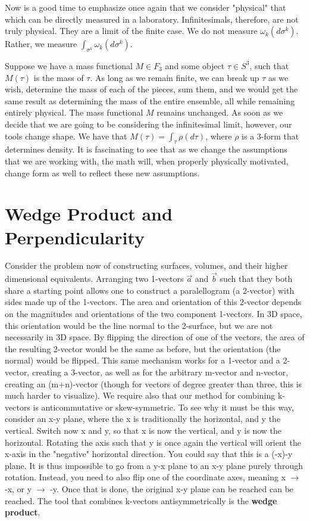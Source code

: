 \documentclass{book}
\begin{document}
Now is a good time to emphasize once again that we consider "physical" that which can be directly measured in a laboratory. Infinitesimals, therefore, are not truly physical. They are a limit of the finite case. We do not measure $\omega_k(d\sigma^k)$. Rather, we measure $\int_{\sigma^k}\omega_k(d\sigma^k)$. 


Suppose we have a mass functional $M \in F_3$ and some object $\tau \in S^3$, such that $M(\tau)$ is the mass of $\tau$.  As long as we remain finite, we can break up $\tau$ as we wish, determine the mass of each of the pieces, sum them, and we would get the same result as determining the mass of the entire ensemble, all while remaining entirely physical. The mass functional $M$ remains unchanged. As soon as we decide that we are going to be considering the infinitesimal limit, however, our tools change shape. We have that $M(\tau) = \int_\tau \rho(d\tau)$, where $\rho$ is a 3-form that determines density. It is fascinating to see that as we change the assumptions that we are working with, the math will, when properly physically motivated, change form as well to reflect these new assumptions. 



\section{Wedge Product and Perpendicularity}

Consider the problem now of constructing surfaces, volumes, and their higher dimensional equivalents. Arranging two 1-vectors $\vec{a}$ and $\vec{b}$ such that they both share a starting point allows one to construct a paralellogram (a 2-vector) with sides made up of the 1-vectors. The area and orientation of this 2-vector depends on the magnitudes and orientations of the two component 1-vectors. In 3D space, this orientation would be the line normal to the 2-surface, but we are not necessarily in 3D space. By flipping the direction of one of the vectors, the area of the resulting 2-vector would be the same as before, but the orientation (the normal) would be flipped. This same mechanism works for a 1-vector and a 2-vector, creating a 3-vector, as well as for the arbitrary m-vector and n-vector, creating an (m+n)-vector (though for vectors of degree greater than three, this is much harder to visualize). We require also that our method for combining k-vectors is anticommutative or skew-symmetric. To see why it must be this way, consider an x-y plane, where the x is traditionally the horizontal, and y the vertical. Switch now x and y, so that x is now the vertical, and y is now the horizontal. Rotating the axis such that y is once again the vertical will orient the x-axis in the "negative" horizontal direction. You could say that this is a (-x)-y plane. It is thus impossible to go from a y-x plane to an x-y plane purely through rotation. Instead, you need to also flip one of the coordinate axes, meaning x $\to$ -x, or y $\to$ -y. Once that is done, the original x-y plane can be reached can be reached. The tool that combines k-vectors antisymmetrically is the \textbf{wedge product}.
\end{document}

